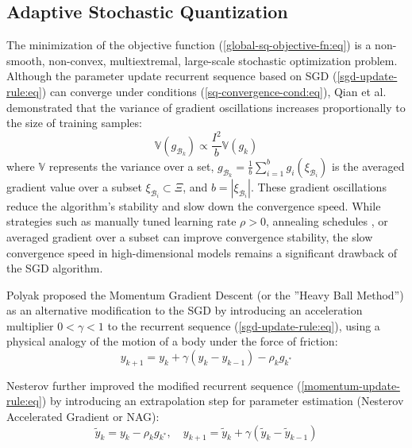 \subsection{Adaptive Stochastic Quantization} \label{adap-stoch-quant:sec}
The minimization of the objective function (\ref{global-sq-objective-fn:eq}) is a non-smooth, non-convex, multiextremal, large-scale stochastic optimization problem. Although the parameter update recurrent sequence based on SGD (\ref{sgd-update-rule:eq}) can converge under conditions (\ref{sq-convergence-cond:eq}), Qian et al. \cite{qian2020} demonstrated that the variance of gradient oscillations increases proportionally to the size of training samples:
\begin{equation}
    \label{sgd-oscillations:eq}
        \mathbb{V} (g_{\mathcal{B}_k}) \propto \frac{I^2}{b} \mathbb{V} (g_k)
\end{equation}
\noindent where $\mathbb{V}$ represents the variance over a set, $g_{\mathcal{B}_k} = \frac{1}{b} \sum_{i=1}^{b} g_i (\xi_{\mathcal{B}_i})$ is the averaged gradient value over a subset $\xi_{\mathcal{B}_i} \subset \Xi$, and $b = | \xi_{\mathcal{B}_i} |$. These gradient oscillations reduce the algorithm's stability and slow down the convergence speed. While strategies such as manually tuned learning rate $\rho > 0$, annealing schedules \cite{Robbins_Monro_1951}, or averaged gradient over a subset can improve convergence stability, the slow convergence speed in high-dimensional models \cite{Norkin_Kozyriev_Norkin_2024} remains a significant drawback of the SGD algorithm.

Polyak \cite{Poliak_1987} proposed the Momentum Gradient Descent (or the ''Heavy Ball Method'') as an alternative modification to the SGD by introducing an acceleration multiplier $0 < \gamma < 1$ to the recurrent sequence (\ref{sgd-update-rule:eq}), using a physical analogy of the motion of a body under the force of friction:
\begin{equation}
    \label{momentum-update-rule:eq}
        y_{k+1} = y_k + \gamma (y_k - y_{k-1}) - \rho_k g_{k^*}
\end{equation}

Nesterov \cite{nesterov1983method,walkington_2023} further improved the modified recurrent sequence (\ref{momentum-update-rule:eq}) by introducing an extrapolation step for parameter estimation (Nesterov Accelerated Gradient or NAG):
\begin{equation}
    \label{nag-update-rule:eq}
        \tilde{y}_k = y_k - \rho_k g_{k^*}, \quad y_{k+1} = \tilde{y}_k + \gamma (\tilde{y}_k - \tilde{y}_{k-1})
\end{equation}

